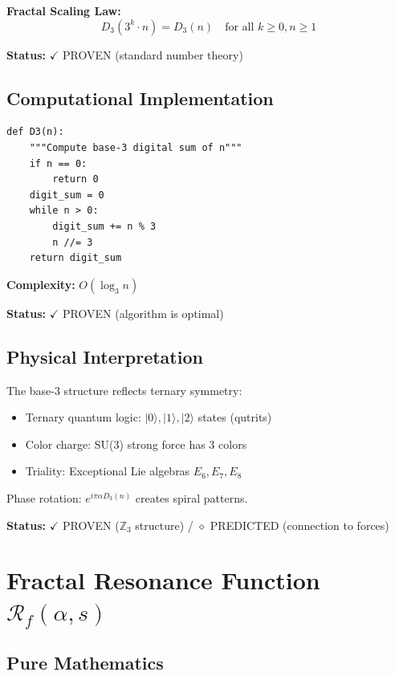 \textbf{Fractal Scaling Law:}
\begin{equation}
D_3(3^k \cdot n) = D_3(n) \quad \text{for all } k \geq 0, n \geq 1
\end{equation}

\textbf{Status:} $\checkmark$ PROVEN (standard number theory)

\subsection{Computational Implementation}

\begin{verbatim}
def D3(n):
    """Compute base-3 digital sum of n"""
    if n == 0:
        return 0
    digit_sum = 0
    while n > 0:
        digit_sum += n % 3
        n //= 3
    return digit_sum
\end{verbatim}

\textbf{Complexity:} $O(\log_3 n)$

\textbf{Status:} $\checkmark$ PROVEN (algorithm is optimal)

\subsection{Physical Interpretation}

The base-3 structure reflects ternary symmetry:
\begin{itemize}
\item Ternary quantum logic: $|0\rangle, |1\rangle, |2\rangle$ states (qutrits)
\item Color charge: SU(3) strong force has 3 colors
\item Triality: Exceptional Lie algebras $E_6, E_7, E_8$
\end{itemize}

Phase rotation: $e^{i\pi\alpha D_3(n)}$ creates spiral patterns.

\textbf{Status:} $\checkmark$ PROVEN ($\mathbb{Z}_3$ structure) / $\diamond$ PREDICTED (connection to forces)

\section{Fractal Resonance Function $\mathcal{R}_f(\alpha, s)$}

\subsection{Pure Mathematics}

